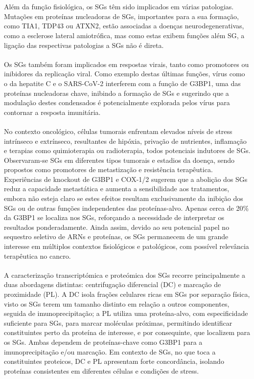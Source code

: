  \\
 \\
 Além da função fisiológica, os SGs têm sido implicados em várias patologias. Mutações em proteínas nucleadoras de SGs, importantes para a sua formação, como TIA1, TDP43 ou ATXN2, estão associadas a doenças neurodegenerativas, como a esclerose lateral amiotrófica\cite{bevivino_expanded_2001, elden_ataxin-2_2010}, mas como estas exibem funções além SG, a ligação das respectivas patologias a SGs não é direta. 
 \\
 \\
 Os SGs também foram implicados em respostas virais, tanto como promotores ou inibidores da replicação viral\cite{guan_multiple_2023}. Como exemplo destas últimas funções, vírus como o da hepatite C e o SARS-CoV-2 interferem com a função de G3BP1, uma das proteínas nucleadoras chave, inibindo a formação de SGs e sugerindo que a modulação destes condensados é potencialmente explorada pelos vírus para contornar a resposta imunitária\cite{guan_multiple_2023}.
 \\
 \\
 No contexto oncológico, células tumorais enfrentam elevados níveis de stress intrínseco e extrínseco, resultantes de hipóxia, privação de nutrientes, inflamação e terapias como quimioterapia ou radioterapia, todos potenciais indutores de SGs\cite{redding_stress_2023, lee_stress_2022}. Observaram-se SGs em diferentes tipos tumorais e estadios da doença, sendo propostos como promotores de metastização e resistência terapêutica\cite{somasekharan_yb-1_2015, grabocka_mutant_2016}. Experiências de knockout de G3BP1 e COX-1/2 sugerem que a abolição dos SGs reduz a capacidade metastática e aumenta a sensibilidade aos tratamentos, embora não esteja claro se estes efeitos resultam exclusivamente da inibição dos SGs ou de outras funções independentes das proteínas-alvo\cite{somasekharan_yb-1_2015, grabocka_mutant_2016}. Apenas cerca de 20\% da G3BP1 se localiza nos SGs\cite{somasekharan_g3bp1-linked_2020}, reforçando a necessidade de interpretar os resultados ponderadamente. Ainda assim, devido ao seu potencial papel no sequestro seletivo de ARNs e proteínas, os SGs permanecem de um grande interesse em múltiplos contextos fisiológicos e patológicos, com possível relevância terapêutica no cancro.
 \\
 \\
 A caracterização transcriptómica e proteómica dos SGs recorre principalmente a duas abordagens distintas: centrifugação diferencial (DC)\cite{khong_stress_2017} e marcação de proximidade (PL)\cite{somasekharan_g3bp1-linked_2020}. A DC isola frações celulares ricas em SGs por separação física, visto os SGs terem um tamanho distinto em relação a outros componentes, seguida de imunoprecipitação\cite{khong_stress_2017}; a PL utiliza uma proteína-alvo, com especificidade suficiente para SGs, para marcar moléculas próximas, permitindo identificar constituintes perto da proteína de interesse, e por consequinte, que localizem para os SGs\cite{somasekharan_g3bp1-linked_2020}. Ambas dependem de proteínas-chave como G3BP1 para a imunoprecipitação e/ou marcação. Em contexto de SGs, no que toca a constituintes proteicos, DC e PL apresentam forte concordância, isolando proteínas consistentes em diferentes células e condições de stress\cite{glauninger_stressful_2022}.
